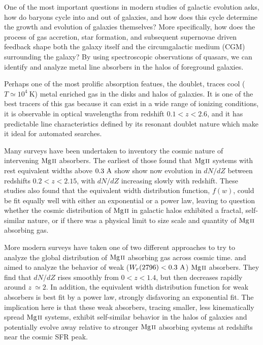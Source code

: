 \documentclass[iop,apj,numberedappendix,appendixfloats,twocolappendix]{emulateapj}
\begin{document}
One of the most important questions in modern studies of galactic evolution asks, how do baryons cycle into and out of galaxies, and how does this cycle determine the growth and evolution of galaxies themselves? More specifically, how does the process of gas accretion, star formation, and subsequent supernovae driven feedback shape both the galaxy itself and the circumgalactic medium (CGM) surrounding the galaxy? By using spectroscopic observations of quasars, we can identify and analyze metal line absorbers in the halos of foreground galaxies. 

Perhaps one of the most prolific absorption featues, the {\MgIIdblt} doublet, traces cool ($T \simeq 10^4~\mathrm{K}$) metal enriched gas in the disks and halos of galaxies. It is one of the best tracers of this gas because it can exist in a wide range of ionizing conditions, it is observable in optical wavelengths from redshift $0.1 < z < 2.6$, and it has predictable line characteristics defined by its resonant doublet nature which make it ideal for automated searches. 

Many surveys have been undertaken to inventory the cosmic nature of intervening ${\hbox{{\rm Mg}\kern 0.1em{\sc ii}}}$ absorbers. The earliest of those \citep{Lanzetta1987,Tytler1987,Sargent1988,Steidel1992} found that ${\hbox{{\rm Mg}\kern 0.1em{\sc ii}}}$ systems with rest equivalent widths above $0.3~\mathrm{\AA}$ show show now evolution in $dN\!/dZ$ between redshifts $0.2 < z < 2.15$, with $dN\!/dZ$ increasing slowly with redshift. These studies also found that the equivalent width distribution function, $f(w)$, could be fit equally well with either an exponential or a power law, leaving to question whether the cosmic distribution of ${\hbox{{\rm Mg}\kern 0.1em{\sc ii}}}$ in galactic halos exhibited a fractal, self-similar nature, or if there was a physical limit to size scale and quantity of ${\hbox{{\rm Mg}\kern 0.1em{\sc ii}}}$ absorbing gas. 

More modern surveys have taken one of two different approaches to try to analyze the global distribution of ${\hbox{{\rm Mg}\kern 0.1em{\sc ii}}}$ absorbing gas across cosmic time. \cite{Churchill1999} and \cite{Narayanan2007} aimed to analyze the behavior of weak ($W_r(2796) < 0.3~\mathrm{\AA}$) ${\hbox{{\rm Mg}\kern 0.1em{\sc ii}}}$ absorbers. They find that $dN\!/dZ$ rises smoothly from $0 < z < 1.4$, but then decreases rapidly around $z~\simeq 2$. In addition, the equivalent width distribution function for weak absorbers is best fit by a power law, strongly disfavoring an exponential fit. The implication here is that these weak absorbers, tracing smaller, less kinematically spread ${\hbox{{\rm Mg}\kern 0.1em{\sc ii}}}$ systems, exhibit self-similar behavior in the halos of galaxies and potentially evolve away relative to stronger ${\hbox{{\rm Mg}\kern 0.1em{\sc ii}}}$ absorbing systems at redshifts near the cosmic SFR peak. 
\end{document}

